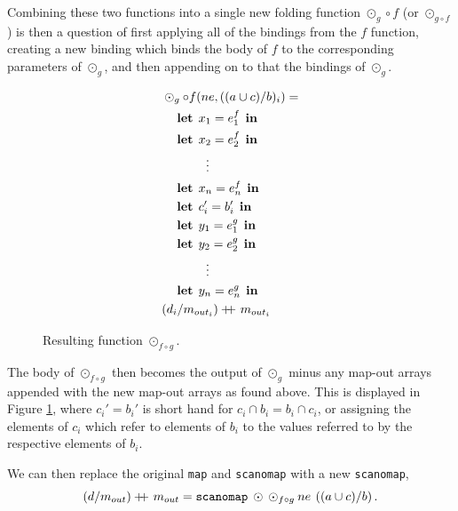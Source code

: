 \documentclass[11pt,bibliography=totocnumbered]{article}
\newcommand\doubleplus{+\kern-1.3ex+\kern0.8ex}
\newcommand\lett{\phantom{-}\:\:\mathbf{let}\:\:}
\newcommand\inn{\:\:\mathbf{in}\:\:}
\begin{document}
Combining these two functions into a single new folding function $\odot_g \circ f$ (or $\odot_{g \circ f}$) is then a question of first applying all of the bindings
 from the $f$ function, creating a new binding which binds the body of $f$ to the corresponding parameters of $\odot_g$, and then appending on to that the bindings of $\odot_g$.

\begin{figure}[h!]\centering
  \begin{mdframed}[style=alignbox]
    \begin{align*}
      &\odot_{g} \circ f(ne, ((a \cup c) / b)_i) = \\
      &\lett x_1 = e_1^f \inn\\
      &\lett x_2 = e_2^f \inn\\
      &\phantom{----}\vdots\\
      &\lett x_n = e_n^f \inn\\
      &\lett c_i' = b_i' \inn\\
      &\lett y_1 = e_1^g \inn\\
      &\lett y_2 = e_2^g \inn\\
      &\phantom{----}\vdots\\
      &\lett y_n = e_n^g \inn\\
      &(d_i /m_{out_i}) \doubleplus m_{out_i}
    \end{align*}
  \end{mdframed}

  \caption{Resulting function $\odot_{f \circ g}$.}
  \label{fig:fusresfun}
\end{figure}
The body of $\odot_{f\circ g}$ then becomes the output of $\odot_g$ minus any map-out arrays appended with the new map-out arrays as
 found above. This is displayed in Figure \ref{fig:fusresfun}, where $c_i' = b_i'$ is short hand for $c_i \cap b_i = b_i \cap c_i$, or
 assigning the elements of $c_i$ which refer to elements of $b_i$ to the values referred to by the respective elements of $b_i$.

We can then replace the original \texttt{map} and \texttt{scanomap} with a new \texttt{scanomap},
$$(d / m_{out}) \doubleplus m_{out} = \mathtt{scanomap} \: \odot \: \odot_{f \circ g} \: ne \: \left((a \cup c) / b \right)\mathnormal{.} $$
\end{document}
